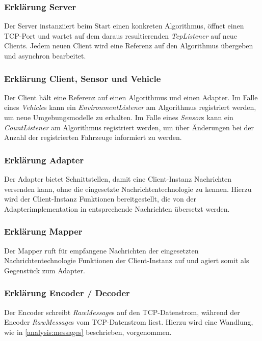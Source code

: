 \subsubsection{Erklärung Server}

Der Server instanziiert beim Start einen konkreten Algorithmus, öffnet einen TCP-Port und wartet auf dem daraus resultierenden \textit{TcpListener} auf neue Clients.
Jedem neuen Client wird eine Referenz auf den Algorithmus übergeben und asynchron bearbeitet.

\subsubsection{Erklärung Client, Sensor und Vehicle}

Der Client hält eine Referenz auf einen Algorithmus und einen Adapter.
Im Falle eines \textit{Vehicle}s kann ein \textit{EnvironmentListener} am Algorithmus registriert werden, um neue Umgebungsmodelle zu erhalten.
Im Falle eines \textit{Sensor}s kann ein \textit{CountListener} am Algorithmus registriert werden, um über Änderungen bei der Anzahl der registrierten Fahrzeuge informiert zu werden.

\subsubsection{Erklärung Adapter}

Der Adapter bietet  Schnittstellen, damit eine Client-Instanz Nachrichten versenden kann, ohne die eingesetzte Nachrichtentechnologie zu kennen.
Hierzu wird der Client-Instanz Funktionen bereitgestellt, die von der Adapterimplementation in entsprechende Nachrichten übersetzt werden.

\subsubsection{Erklärung Mapper}

Der Mapper ruft für empfangene Nachrichten der eingesetzten Nachrichtentechnologie Funktionen der Client-Instanz auf und agiert somit als Gegenstück zum Adapter.

\subsubsection{Erklärung Encoder / Decoder}

Der Encoder schreibt \textit{RawMessage}s auf den TCP-Datenstrom, während der Encoder \textit{RawMessage}s vom TCP-Datenstrom liest.
Hierzu wird eine Wandlung, wie in \autoref{analysis:messages} beschrieben, vorgenommen.

